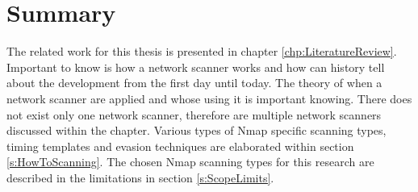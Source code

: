 \section{Summary}
The related work for this thesis is presented in chapter \ref{chp:LiteratureReview}.
Important to know is how a network scanner works and how can history tell about the development from the first day until today.
The theory of when a network scanner are applied and whose using it is important knowing.
There does not exist only one network scanner, therefore are multiple network scanners discussed within the chapter.
Various types of Nmap specific scanning types, timing templates and evasion techniques are elaborated within section \ref{s:HowToScanning}.
The chosen Nmap scanning types for this research are described in the limitations in section \ref{s:ScopeLimits}.